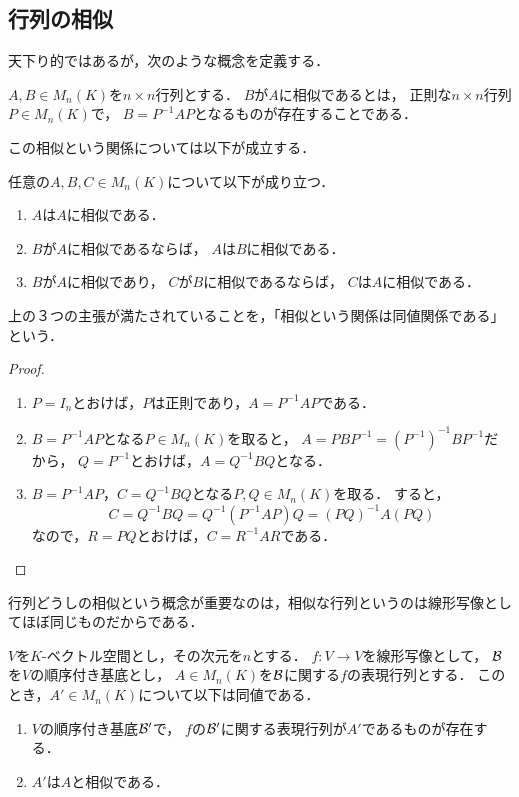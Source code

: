 \subsection{行列の相似}
天下り的ではあるが，次のような概念を定義する．
\begin{dfn}
    $A,B\in M_n(K)$を$n \times n$行列とする．
    $B$が$A$に相似であるとは，
    正則な$n \times n$行列$P \in M_n(K)$で，
    $B = P^{-1}AP$となるものが存在することである．
\end{dfn}
この相似という関係については以下が成立する．
\begin{prop}
    任意の$A,B,C \in M_n(K)$について以下が成り立つ．
    \begin{enumerate}
        \item $A$は$A$に相似である．
        \item $B$が$A$に相似であるならば，
        $A$は$B$に相似である．
        \item $B$が$A$に相似であり，
        $C$が$B$に相似であるならば，
        $C$は$A$に相似である．
    \end{enumerate}
\end{prop}
\begin{remark}
    上の３つの主張が満たされていることを，「相似という関係は同値関係である」という．
\end{remark}
\begin{proof}
    \begin{enumerate}
        \item $P=I_n$とおけば，$P$は正則であり，$A = P^{-1}AP$である．
        \item $B=P^{-1}AP$となる$P \in M_n(K)$を取ると，
        $A = PBP^{-1} = (P^{-1})^{-1} B P^{-1}$だから，
        $Q=P^{-1}$とおけば，$A = Q^{-1}BQ$となる．
        \item $B = P^{-1}AP$，$C=Q^{-1}BQ$となる$P,Q \in M_n(K)$を取る．
        すると，
        \[
            C = Q^{-1}BQ = Q^{-1}(P^{-1}AP)Q = (PQ)^{-1}A(PQ)
        \]
        なので，$R=PQ$とおけば，$C=R^{-1}AR$である．
    \end{enumerate}
\end{proof}
行列どうしの相似という概念が重要なのは，相似な行列というのは線形写像としてほぼ同じものだからである．
\begin{prop}\label{prop:basis_and_similarity}
    $V$を$K$-ベクトル空間とし，その次元を$n$とする．
    $f \colon V \to V$を線形写像として，
    $\mathcal{B}$を$V$の順序付き基底とし，
    $A \in M_n(K)$を$\mathcal{B}$に関する$f$の表現行列とする．
    このとき，$A' \in M_n(K)$について以下は同値である．
    \begin{enumerate}
        \item $V$の順序付き基底$\mathcal{B}'$で，
        $f$の$\mathcal{B}'$に関する表現行列が$A'$であるものが存在する．
        \item $A'$は$A$と相似である．
    \end{enumerate}
\end{prop}
